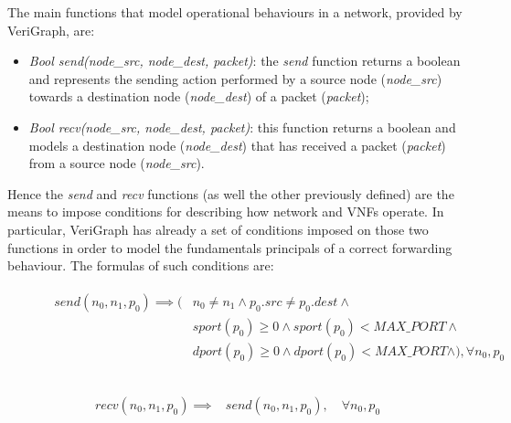  The main functions that model operational behaviours in a network, provided by VeriGraph, are:
\begin{itemize}
	\item \textit{Bool send(node\_src, node\_dest, packet)}: the \textit{send} function returns a boolean and represents the sending action performed by a source node (\textit{node\_src}) towards a destination node (\textit{node\_dest}) of a packet (\textit{packet});
	\item \textit{Bool recv(node\_src, node\_dest, packet)}:  this function returns a boolean and models a destination node (\textit{node\_dest}) that has received  a packet (\textit{packet}) from a source node (\textit{node\_src}). 
\end{itemize} 
Hence the \textit{send} and \textit{recv} functions (as well the other previously defined) are the means to impose conditions for describing how network and VNFs operate. In particular, VeriGraph has already a set of conditions imposed on those two functions in order to model the fundamentals principals of a correct forwarding behaviour. The formulas of such conditions are:
\begin{figure}[h]
	{\footnotesize
		\begin{subequations}
			\begin{align}
				\begin{split}
					\label{send-formulas}
					send(n_{0}, n_{1}, p_{0}) \implies (& n_{0} \neq n_{1} \wedge p_{0}.src \neq p_{0}.dest \wedge \\
					& sport(p_{0}) \geq 0 \wedge sport(p_{0}) < MAX\_PORT \wedge \\
					& dport(p_{0}) \geq 0 \wedge dport(p_{0}) < MAX\_PORT \wedge),\forall n_{0}, p_{0}  \\
					 \quad \\
				\end{split}
			\end{align}
		\end{subequations}}
\end{figure} 
\begin{figure}[h]
		{\footnotesize
			\begin{subequations}
				\begin{align}
					\begin{split}
						\label{recv-formulas}
					    recv(n_{0}, n_{1}, p_{0}) \implies
 					    & send(n_{0}, n_{1}, p_{0}) , \quad \forall n_{0}, p_{0} \\
					\end{split}
				\end{align}
				\label{formula1}
			\end{subequations}}
\end{figure} \\
